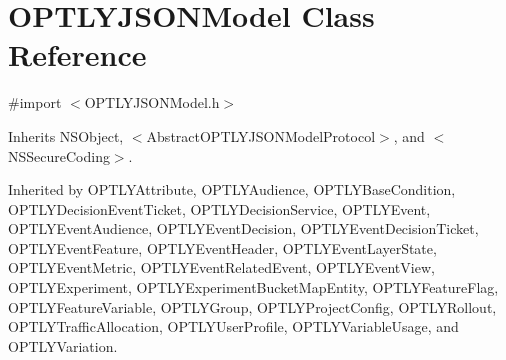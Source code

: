 \hypertarget{interface_o_p_t_l_y_j_s_o_n_model}{}\section{O\+P\+T\+L\+Y\+J\+S\+O\+N\+Model Class Reference}
\label{interface_o_p_t_l_y_j_s_o_n_model}


{\ttfamily \#import $<$O\+P\+T\+L\+Y\+J\+S\+O\+N\+Model.\+h$>$}



Inherits N\+S\+Object, $<$\+Abstract\+O\+P\+T\+L\+Y\+J\+S\+O\+N\+Model\+Protocol$>$, and $<$\+N\+S\+Secure\+Coding$>$.



Inherited by O\+P\+T\+L\+Y\+Attribute, O\+P\+T\+L\+Y\+Audience, O\+P\+T\+L\+Y\+Base\+Condition, O\+P\+T\+L\+Y\+Decision\+Event\+Ticket, O\+P\+T\+L\+Y\+Decision\+Service, O\+P\+T\+L\+Y\+Event, O\+P\+T\+L\+Y\+Event\+Audience, O\+P\+T\+L\+Y\+Event\+Decision, O\+P\+T\+L\+Y\+Event\+Decision\+Ticket, O\+P\+T\+L\+Y\+Event\+Feature, O\+P\+T\+L\+Y\+Event\+Header, O\+P\+T\+L\+Y\+Event\+Layer\+State, O\+P\+T\+L\+Y\+Event\+Metric, O\+P\+T\+L\+Y\+Event\+Related\+Event, O\+P\+T\+L\+Y\+Event\+View, O\+P\+T\+L\+Y\+Experiment, O\+P\+T\+L\+Y\+Experiment\+Bucket\+Map\+Entity, O\+P\+T\+L\+Y\+Feature\+Flag, O\+P\+T\+L\+Y\+Feature\+Variable, O\+P\+T\+L\+Y\+Group, O\+P\+T\+L\+Y\+Project\+Config, O\+P\+T\+L\+Y\+Rollout, O\+P\+T\+L\+Y\+Traffic\+Allocation, O\+P\+T\+L\+Y\+User\+Profile, O\+P\+T\+L\+Y\+Variable\+Usage, and O\+P\+T\+L\+Y\+Variation.

